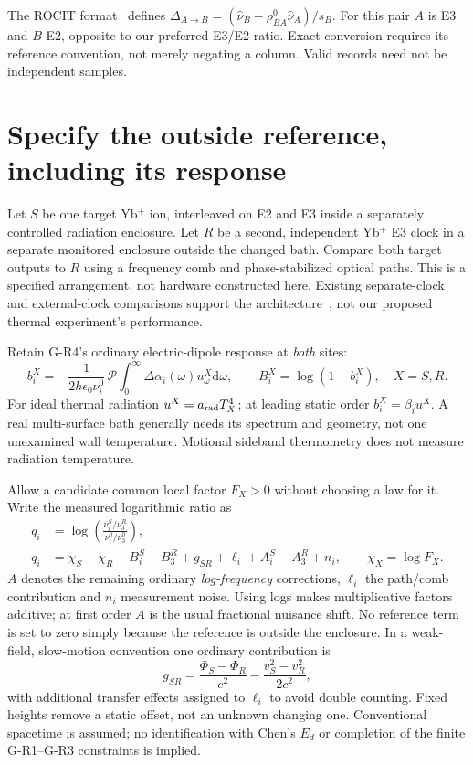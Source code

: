 \documentclass[11pt,a4paper]{article}
\newcommand{\dd}{\mathrm d}
\begin{document}
The ROCIT format~\cite{format} defines
$\Delta_{A\to B}=(\widehat\nu_B-\rho^0_{BA}\widehat\nu_A)/s_B$.
For this pair $A$ is E3 and $B$ E2, opposite to our preferred E3/E2
ratio. Exact conversion requires its reference convention, not merely
negating a column. Valid records need not be independent samples.

\newpage
\section{Specify the outside reference, including its response}
Let $S$ be one target Yb$^+$ ion, interleaved on E2 and E3 inside a
separately controlled radiation enclosure. Let $R$ be a second,
independent Yb$^+$ E3 clock in a separate monitored enclosure outside
the changed bath. Compare both target outputs to $R$ using a frequency
comb and phase-stabilized optical paths. This is a specified arrangement,
not hardware constructed here. Existing separate-clock and external-clock
comparisons support the architecture~\cite{network,steinel}, not our
proposed thermal experiment's performance.

Retain G-R4's ordinary electric-dipole response at \emph{both} sites:
\begin{equation}\label{eq:b}
 b_i^X=-\frac{1}{2h\epsilon_0\nu_i^0}\,\mathcal P
 \int_0^\infty\Delta\alpha_i(\omega)u_\omega^X\dd\omega,
 \qquad B_i^X=\log(1+b_i^X),\quad X=S,R.
\end{equation}
For ideal thermal radiation $u^X=a_{\rm rad}T_X^4$; at leading static
order $b_i^X=\beta_i u^X$. A real multi-surface bath generally needs its
spectrum and geometry, not one unexamined wall temperature. Motional
sideband thermometry does not measure radiation temperature.

Allow a candidate common local factor $F_X>0$ without choosing a law
for it. Write the measured logarithmic ratio as
\begin{align}
 q_i&=\log\left(\frac{\nu_i^S/\nu_3^R}{\nu_i^0/\nu_3^0}\right),\\
 q_i&=\chi_S-\chi_R+B_i^S-B_3^R
       +g_{SR}+\ell_i+A_i^S-A_3^R+n_i,\qquad \chi_X=\log F_X.
       \label{eq:observation}
\end{align}
$A$ denotes the remaining ordinary \emph{log-frequency} corrections,
$\ell_i$ the path/comb contribution and $n_i$ measurement noise.
Using logs makes multiplicative factors additive; at first order $A$
is the usual fractional nuisance shift. No reference term is set to
zero simply because the reference is outside the enclosure. In a
weak-field, slow-motion convention one ordinary contribution is
\begin{equation}
 g_{SR}=\frac{\Phi_S-\Phi_R}{c^2}
       -\frac{v_S^2-v_R^2}{2c^2},
\end{equation}
with additional transfer effects assigned to $\ell_i$ to avoid double
counting. Fixed heights remove a static offset, not an unknown changing
one. Conventional spacetime is assumed; no identification with Chen's
$E_d$ or completion of the finite G-R1--G-R3 constraints is implied.
\end{document}
